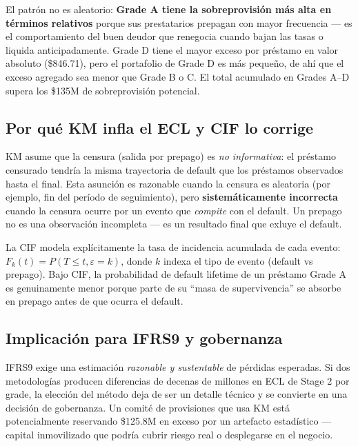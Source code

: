 \documentclass[
  spanish,
  11pt,
  letterpaper,
]{scrbook}
\theoremstyle{plain}
\theoremstyle{remark}
\begin{document}
El patrón no es aleatorio: \textbf{Grade A tiene la sobreprovisión más
alta en términos relativos} porque sus prestatarios prepagan con mayor
frecuencia --- es el comportamiento del buen deudor que renegocia cuando
bajan las tasas o liquida anticipadamente. Grade D tiene el mayor exceso
por préstamo en valor absoluto (\$846.71), pero el portafolio de Grade D
es más pequeño, de ahí que el exceso agregado sea menor que Grade B o C.
El total acumulado en Grades A--D supera los \$135M de sobreprovisión
potencial.

\subsection{Por qué KM infla el ECL y CIF lo
corrige}\label{por-quuxe9-km-infla-el-ecl-y-cif-lo-corrige}

KM asume que la censura (salida por prepago) es \emph{no informativa}:
el préstamo censurado tendría la misma trayectoria de default que los
préstamos observados hasta el final. Esta asunción es razonable cuando
la censura es aleatoria (por ejemplo, fin del período de seguimiento),
pero \textbf{sistemáticamente incorrecta} cuando la censura ocurre por
un evento que \emph{compite} con el default. Un prepago no es una
observación incompleta --- es un resultado final que exluye el default.

La CIF modela explícitamente la tasa de incidencia acumulada de cada
evento: \(F_k(t) = P(T \leq t, \varepsilon = k)\), donde \(k\) indexa el
tipo de evento (default vs prepago). Bajo CIF, la probabilidad de
default lifetime de un préstamo Grade A es genuinamente menor porque
parte de su ``masa de supervivencia'' se absorbe en prepago antes de que
ocurra el default.

\subsection{Implicación para IFRS9 y
gobernanza}\label{implicaciuxf3n-para-ifrs9-y-gobernanza}

IFRS9 exige una estimación \emph{razonable y sustentable} de pérdidas
esperadas. Si dos metodologías producen diferencias de decenas de
millones en ECL de Stage 2 por grade, la elección del método deja de ser
un detalle técnico y se convierte en una decisión de gobernanza. Un
comité de provisiones que usa KM está potencialmente reservando \$125.8M
en exceso por un artefacto estadístico --- capital inmovilizado que
podría cubrir riesgo real o desplegarse en el negocio.
\end{document}
